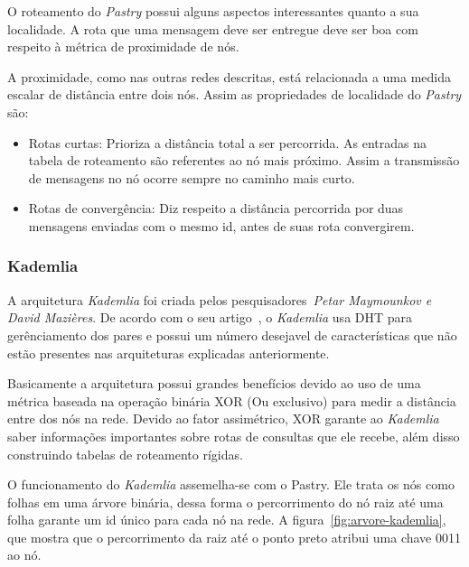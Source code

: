 O roteamento do \emph{Pastry} possui alguns aspectos interessantes quanto a sua localidade. A rota que uma mensagem deve ser entregue deve ser boa com respeito à métrica de proximidade de nós.

A proximidade, como nas outras redes descritas, está relacionada a uma medida escalar de distância entre dois nós. Assim as propriedades de localidade do \emph{Pastry} são:
\begin{itemize}
	\item Rotas curtas: Prioriza a distância total a ser percorrida. As entradas na tabela de roteamento são referentes ao nó mais próximo. Assim a transmissão de mensagens no nó ocorre sempre no caminho mais curto.
	\item Rotas de convergência: Diz respeito a distância percorrida por duas mensagens enviadas com o mesmo id, antes de suas rota convergirem.
\end{itemize}

\subsubsection{Kademlia}

A arquitetura \emph{Kademlia} foi criada pelos pesquisadores~\emph{Petar Maymounkov e David Mazières}. De acordo com o seu artigo~\cite{maymounkov02}, o \emph{Kademlia} usa DHT para gerênciamento dos pares e possui um número desejavel de características que não estão presentes nas arquiteturas explicadas anteriormente.

Basicamente a arquitetura possui grandes benefícios devido ao uso de uma métrica baseada na operação binária XOR (Ou exclusivo) para medir a distância entre dos nós na rede. Devido ao fator assimétrico, XOR garante ao \emph{Kademlia} saber informações importantes sobre rotas de consultas que ele recebe, além disso construindo tabelas de roteamento rígidas.

O funcionamento do \emph{Kademlia} assemelha-se com o Pastry. Ele trata os nós como folhas em uma árvore binária, dessa forma o percorrimento do nó raiz até uma folha garante um id único para cada nó na rede. A figura~\ref{fig:arvore-kademlia}, que mostra que o percorrimento da raiz até o ponto preto atribui uma chave 0011 ao nó.

